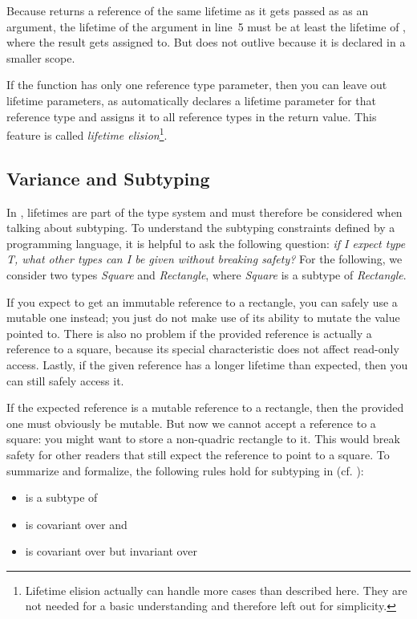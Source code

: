 Because  returns a reference of the same lifetime as it gets passed as as an argument, the lifetime of the argument  in line~5 must be at least the lifetime of , where the result gets assigned to.
But  does not outlive  because it is declared in a smaller scope.

If the function has only one reference type parameter, then you can leave out lifetime parameters, as \rust automatically declares a lifetime parameter for that reference type and assigns it to all reference types in the return value.
This feature is called \emph{lifetime elision}\footnote{Lifetime elision actually can handle more cases than described here.
They are not needed for a basic understanding and therefore left out for simplicity.}.


\subsection{Variance and Subtyping}

In \rust, lifetimes are part of the type system and must therefore be considered when talking about subtyping.
To understand the subtyping constraints defined by a programming language, it is helpful to ask the following question:
\textit{if I expect type T, what other types can I be given without breaking safety?}
For the following, we consider two types \emph{Square} and \emph{Rectangle}, where \emph{Square} is a subtype of \emph{Rectangle}.

If you expect to get an immutable reference to a rectangle, you can safely use a mutable one instead;
you just do not make use of its ability to mutate the value pointed to.
There is also no problem if the provided reference is actually a reference to a square, because its special characteristic does not affect read-only access.
Lastly, if the given reference has a longer lifetime than expected, then you can still safely access it.

If the expected reference is a mutable reference to a rectangle, then the provided one must obviously be mutable.
But now we cannot accept a reference to a square:
you might want to store a non-quadric rectangle to it.
This would break safety for other readers that still expect the reference to point to a square.
To summarize and formalize, the following rules hold for subtyping in \rust (cf. \cite{Rustonomicon}):
\begin{itemize}
\item {} is a subtype of 
\item {} is covariant over  and 
\item {} is covariant over  but invariant over 
\end{itemize}


